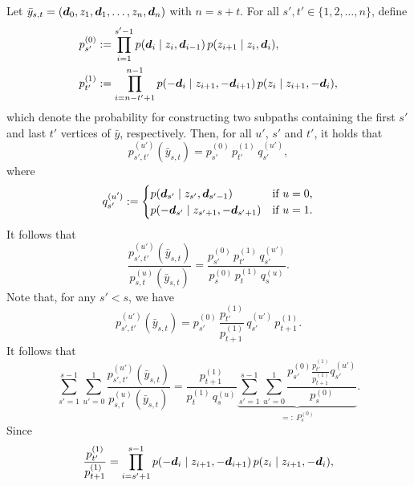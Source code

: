 Let $\bar{y}_{s,t} = (\bm{d}_0, z_1, \bm{d}_1, \ldots, z_n, \bm{d}_n)$ with $n = s + t$.
For all $s', t' \in \{ 1, 2, \ldots, n \}$, define
\begin{align}
p^{(0)}_{s'} &:= \prod_{i = 1}^{s' - 1} p( \bm{d}_i \;|\; z_i, \bm{d}_{i - 1} ) \, p( z_{i + 1} \;|\; z_i, \bm{d}_i ),\\
p^{(1)}_{t'} &:= \prod_{i = n - t' + 1}^{n - 1} p( -\bm{d}_i \;|\; z_{i + 1}, -\bm{d}_{i + 1} ) \, p( z_i \;|\; z_{i + 1}, -\bm{d}_i ),
\end{align}
which denote the probability for constructing two subpaths containing the first $s'$ and last $t'$ vertices of $\bar{y}$, respectively.
Then, for all $u'$, $s'$ and $t'$, it holds that
\begin{equation}
p^{(u')}_{s',t'}(\bar{y}_{s,t}) = p^{(0)}_{s'} \, p^{(1)}_{t'} \, q^{(u')}_{s'},
\end{equation}
where
\begin{equation}
q^{(u')}_{s'} := \begin{cases}
p( \bm{d}_{s'} \;|\; z_{s'}, \bm{d}_{s' - 1} ) & \text{if $u = 0$,}\\
p( -\bm{d}_{s'} \;|\; z_{s' + 1}, -\bm{d}_{s' + 1} ) & \text{if $u = 1$.}
\end{cases}
\end{equation}
It follows that
\begin{equation}
\label{eqn:bdpt_pdf_ratio_0}
\frac{p^{(u')}_{s', t'}(\bar{y}_{s,t})}{p^{(u)}_{s,t}(\bar{y}_{s,t})}
= \frac{p^{(0)}_{s'} \, p^{(1)}_{t'} \, q^{(u')}_{s'}}{p^{(0)}_s \, p^{(1)}_t \, q^{(u)}_s}.
\end{equation}
Note that, for any $s' < s$, we have
\begin{equation}
p^{(u')}_{s', t'}(\bar{y}_{s,t}) = p^{(0)}_{s'} \, \frac{p^{(1)}_{t'}}{p^{(1)}_{t + 1}} \, q^{(u')}_{s'} \,p^{(1)}_{t + 1}.
\end{equation}
It follows that
\begin{equation}
\label{eqn:bdpt_pdf_ratio_1}
\sum_{s' = 1}^{s - 1} \sum_{u' = 0}^1 \frac{p^{(u')}_{s', t'}(\bar{y}_{s,t})}{p^{(u)}_{s,t}(\bar{y}_{s,t})}
= \frac{p^{(1)}_{t + 1}}{p^{(1)}_t \, q^{(u)}_s}
\underbrace{\sum_{s' = 1}^{s - 1} \sum_{u' = 0}^1 \frac{p^{(0)}_{s'} \frac{p^{(1)}_{t'}}{p^{(1)}_{t + 1}} q^{(u')}_{s'}}{p^{(0)}_s}}_{=:\ P^{(0)}_s}.
\end{equation}
Since
\begin{equation}
\frac{p^{(1)}_{t'}}{p^{(1)}_{t + 1}}
= \prod_{i = s' + 1}^{s - 1} p( -\bm{d}_i \;|\; z_{i + 1}, -\bm{d}_{i + 1} ) \, p( z_i \;|\; z_{i + 1}, -\bm{d}_i ),
\end{equation}

